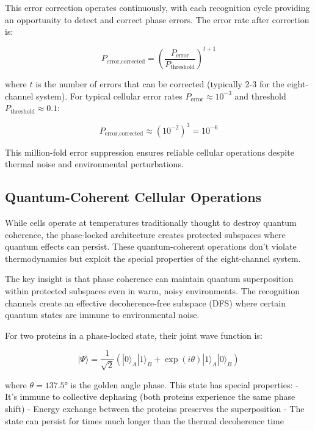 \documentclass[12pt,a4paper]{report}
\begin{document}
This error correction operates continuously, with each recognition cycle providing an opportunity to detect and correct phase errors. The error rate after correction is:

\begin{equation}
P_{\text{error,corrected}} = \left(\frac{P_{\text{error}}}{P_{\text{threshold}}}\right)^{t+1}
\end{equation}

where $t$ is the number of errors that can be corrected (typically 2-3 for the eight-channel system). For typical cellular error rates $P_{\text{error}} \approx 10^{-3}$ and threshold $P_{\text{threshold}} \approx 0.1$:

\begin{equation}
P_{\text{error,corrected}} \approx (10^{-2})^3 = 10^{-6}
\end{equation}

This million-fold error suppression ensures reliable cellular operations despite thermal noise and environmental perturbations.

\subsection{Quantum-Coherent Cellular Operations}

While cells operate at temperatures traditionally thought to destroy quantum coherence, the phase-locked architecture creates protected subspaces where quantum effects can persist. These quantum-coherent operations don't violate thermodynamics but exploit the special properties of the eight-channel system.

The key insight is that phase coherence can maintain quantum superposition within protected subspaces even in warm, noisy environments. The recognition channels create an effective decoherence-free subspace (DFS) where certain quantum states are immune to environmental noise.

For two proteins in a phase-locked state, their joint wave function is:

\begin{equation}
|\Psi\rangle = \frac{1}{\sqrt{2}}(|0\rangle_A |1\rangle_B + \exp(i\theta)|1\rangle_A |0\rangle_B)
\end{equation}

where $\theta = 137.5°$ is the golden angle phase. This state has special properties:
- It's immune to collective dephasing (both proteins experience the same phase shift)
- Energy exchange between the proteins preserves the superposition
- The state can persist for times much longer than the thermal decoherence time
\end{document}
